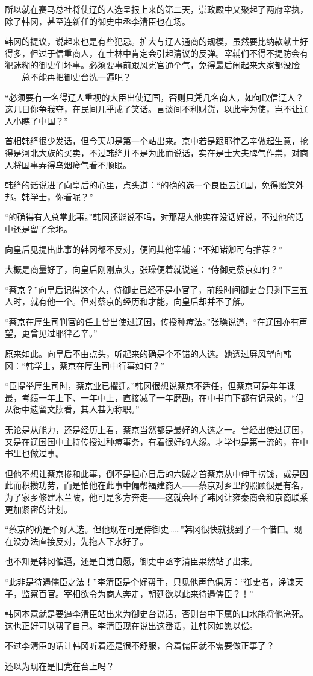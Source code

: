 所以就在赛马总社将使辽的人选呈报上来的第二天，崇政殿中又聚起了两府宰执，除了韩冈，甚至连新任的御史中丞李清臣也在场。

韩冈的提议，说起来也是有些犯忌。扩大与辽人通商的规模，虽然要比纳款献土好得多，但过于信重商人，在士林中肯定会引起清议的反弹。宰辅们不得不提防会有犯迷糊的御史们坏事。必须要事前跟风宪官通个气，免得最后闹起来大家都没脸——总不能再把御史台洗一遍吧？

“必须要有一名得辽人重视的大臣出使辽国，否则只凭几名商人，如何取信辽人？这几日你争我夺，在民间几乎成了笑话。言谈间不利财货，以此辈为使，岂不让辽人小瞧了中国？”

首相韩绛很少发话，但今天却是第一个站出来。京中若是跟耶律乙辛做起生意，抢得是河北大族的买卖，不过韩绛并不是为此而说话，实在是士大夫脾气作祟，对商人将国事弄得乌烟瘴气看不顺眼。

韩绛的话说进了向皇后的心里，点头道：“的确的选一个良臣去辽国，免得贻笑外邦。韩学士，你看呢？”

“的确得有人总掌此事。”韩冈还能说不吗，对那帮人他实在没话好说，不过他的话中还是留了余地。

向皇后见提出此事的韩冈都不反对，便问其他宰辅：“不知诸卿可有推荐？”

大概是商量好了，向皇后刚刚点头，张璪便着就说道：“侍御史蔡京如何？”

“蔡京？”向皇后记得这个人，侍御史已经不是小官了，前段时间御史台只剩下三五人时，就有他一个。但对蔡京的经历和才能，向皇后却并不了解。

“蔡京在厚生司判官的任上曾出使过辽国，传授种痘法。”张璪说道，“在辽国亦有声望，更曾见过耶律乙辛。”

原来如此。向皇后不由点头，听起来的确是个不错的人选。她透过屏风望向韩冈：“韩学士，蔡京在厚生司中行事如何？”

“臣提举厚生司时，蔡京业已擢迁。”韩冈很想说蔡京不适任，但蔡京可是年年课最，考绩一年上下、一年中上，直接减了一年磨勘，在中书门下都有记录的，“但从衙中遗留文牍看，其人甚为称职。”

无论是从能力，还是经历上看，蔡京当然都是最好的人选之一。曾经出使过辽国，又是在辽国国中主持传授过种痘事务，有着很好的人缘。才学也是第一流的，在中书里也做过事。

但他不想让蔡京掺和此事，倒不是担心日后的六贼之首蔡京从中伸手捞钱，或是因此而积攒功劳，而是怕他在此事中偏帮福建商人——蔡京对乡里的照顾很是有名，为了家乡修建木兰陂，他可是多方奔走——这就会坏了韩冈让雍秦商会和京商联系更加紧密的计划。

“蔡京的确是个好人选。但他现在可是侍御史……”韩冈很快就找到了一个借口。现在没办法直接反对，先拖人下水好了。

也不知是韩冈催逼，还是自觉自愿，御史中丞李清臣果然站了出来。

“此非是待遇儒臣之法！”李清臣是个好帮手，只见他声色俱厉：“御史者，诤谏天子，监察百官。宰相欲令为商人奔走，朝廷欲以此来待遇儒臣？！”

韩冈本意就是要逼李清臣站出来为御史台说话，否则台中下属的口水能将他淹死。这也正好可以帮了自己。李清臣现在说出这番话，让韩冈如愿以偿。

不过李清臣的话让韩冈听着还是很不舒服，合着儒臣就不需要做正事了？

还以为现在是旧党在台上吗？
